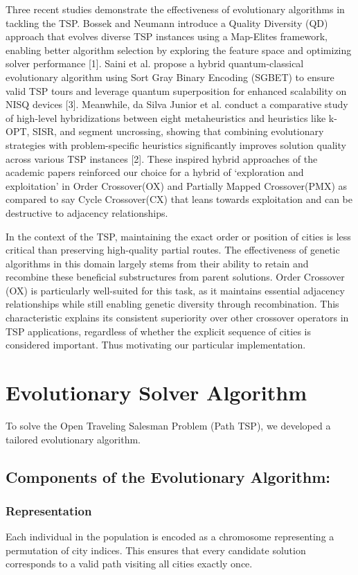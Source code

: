 \documentclass{scrartcl}
\begin{document}
Three recent studies demonstrate the effectiveness of evolutionary algorithms in tackling the TSP. Bossek and Neumann introduce a Quality Diversity (QD) approach that evolves diverse TSP instances using a Map-Elites framework, enabling better algorithm selection by exploring the feature space and optimizing solver performance [1]. Saini et al. propose a hybrid quantum-classical evolutionary algorithm using Sort Gray Binary Encoding (SGBET) to ensure valid TSP tours and leverage quantum superposition for enhanced scalability on NISQ devices [3]. Meanwhile, da Silva Junior et al. conduct a comparative study of high-level hybridizations between eight metaheuristics and heuristics like k-OPT, SISR, and segment uncrossing, showing that combining evolutionary strategies with problem-specific heuristics significantly improves solution quality across various TSP instances [2]. 
These inspired hybrid approaches of the academic papers reinforced our choice for a hybrid of ‘exploration and exploitation’ in Order Crossover(OX) and Partially Mapped Crossover(PMX) as compared to say Cycle Crossover(CX) that leans towards exploitation and can be destructive to adjacency relationships.

In the context of the TSP, maintaining the exact order or position of cities is less critical than preserving high-quality partial routes. The effectiveness of genetic algorithms in this domain largely stems from their ability to retain and recombine these beneficial substructures from parent solutions. Order Crossover (OX) is particularly well-suited for this task, as it maintains essential adjacency relationships while still enabling genetic diversity through recombination. This characteristic explains its consistent superiority over other crossover operators in TSP applications, regardless of whether the explicit sequence of cities is considered important. Thus motivating our particular implementation.


\section{Evolutionary Solver Algorithm}
To solve the Open Traveling Salesman Problem (Path TSP), we developed a tailored evolutionary algorithm. 
\subsection{Components of the Evolutionary Algorithm:}
\subsubsection{Representation}
Each individual in the population is encoded as a chromosome representing a permutation of city indices. This ensures that every candidate solution corresponds to a valid path visiting all cities exactly once.
\end{document}
